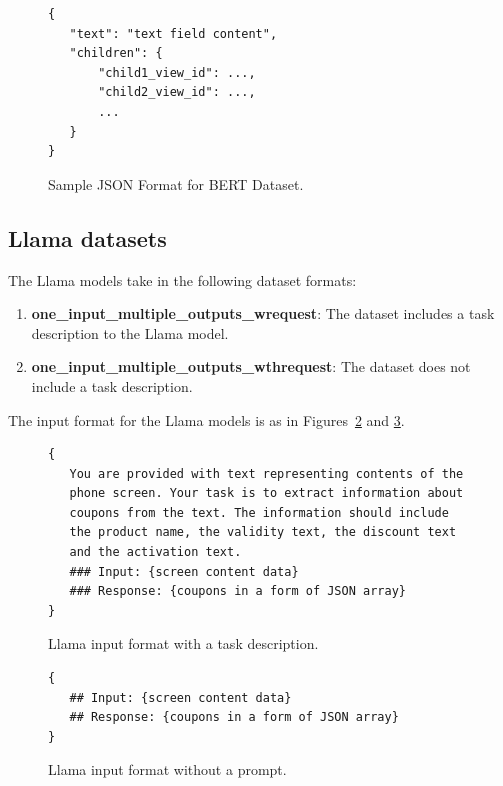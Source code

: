 \documentclass[licencjacka,en]{pracamgr}
\begin{document}
\begin{figure}[htbp]
\centering
\begin{tcolorbox}[sharp corners, boxrule=0.5mm, colframe=black, colback=white, coltitle=black, width=0.9\textwidth]
\begin{BVerbatim}
{
   "text": "text field content",
   "children": {
       "child1_view_id": ...,
       "child2_view_id": ...,
       ...
   }
}
\end{BVerbatim}
\end{tcolorbox}
\caption{Sample JSON Format for BERT Dataset.}
\label{fig:json_example_xml_tree}
\end{figure}

\subsection{Llama datasets}\label{llamaDsDesc}
The Llama models take in the following dataset formats:

\begin{enumerate}
    \item \textbf{one\_input\_multiple\_outputs\_wrequest}: The dataset includes a task description to the Llama model.
    \item \textbf{one\_input\_multiple\_outputs\_wthrequest}: The dataset does not include a task description.
\end{enumerate}

The input format for the Llama models is as in Figures~\ref{fig:llama_ds_w} and \ref{fig:llama_ds_wth}.

\begin{figure}[htbp]
\centering
\begin{tcolorbox}[sharp corners, boxrule=0.5mm, colframe=black, colback=white, coltitle=black, width=0.9\textwidth]
\begin{BVerbatim}
{
   You are provided with text representing contents of the
   phone screen. Your task is to extract information about
   coupons from the text. The information should include
   the product name, the validity text, the discount text
   and the activation text.
   ### Input: {screen content data}
   ### Response: {coupons in a form of JSON array}
}
\end{BVerbatim}
\end{tcolorbox}
\caption{Llama input format with a task description.}
\label{fig:llama_ds_w}
\end{figure}

\begin{figure}[htbp]
\centering
\begin{tcolorbox}[sharp corners, boxrule=0.5mm, colframe=black, colback=white, coltitle=black, width=0.9\textwidth]
\begin{BVerbatim}
{
   ## Input: {screen content data}
   ## Response: {coupons in a form of JSON array}
}
\end{BVerbatim}
\end{tcolorbox}
\caption{Llama input format without a prompt.}
\label{fig:llama_ds_wth}
\end{figure}
\end{document}
